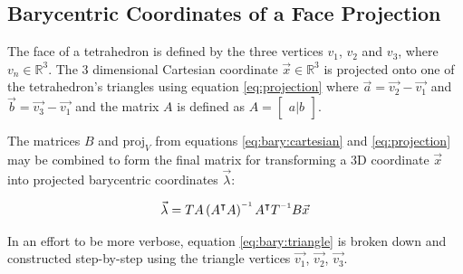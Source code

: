 \subsection{Barycentric Coordinates of a Face Projection}

The face of a  tetrahedron  is  defined  by  the three vertices $v_1$, $v_2$ and
$v_3$,  where  $v_n \in \mathbb{R}^3$. The 3  dimensional  Cartesian  coordinate
$\vec{x}\in\mathbb{R}^3$  is  projected  onto one of the tetrahedron's triangles
using equation \ref{eq:projection} where $\vec{a}  =  \vec{v_2}  - \vec{v_1}$
and  $\vec{b} = \vec{v_3}  -  \vec{v_1}$  and  the  matrix  $A$  is  defined  as
$A=\begin{bmatrix} a|b \end{bmatrix}$.

The matrices $B$ and $\text{proj}_V$ from equations \ref{eq:bary:cartesian}  and
\ref{eq:projection} may be combined to form the final matrix  for transforming a
3D coordinate $\vec{x}$ into projected
barycentric coordinates $\vec{\lambda}$:

\begin{align}
    \label{eq:bary:triangle}
    \vec{\lambda} = TA\left(A\transpose A\right)\inverse A\transpose T\inverse B \vec{x}
\end{align}

In  an effort to be more verbose, equation \ref{eq:bary:triangle} is broken down
and   constructed   step-by-step   using  the  triangle  vertices   $\vec{v_1}$,
$\vec{v_2}$, $\vec{v_3}$.

